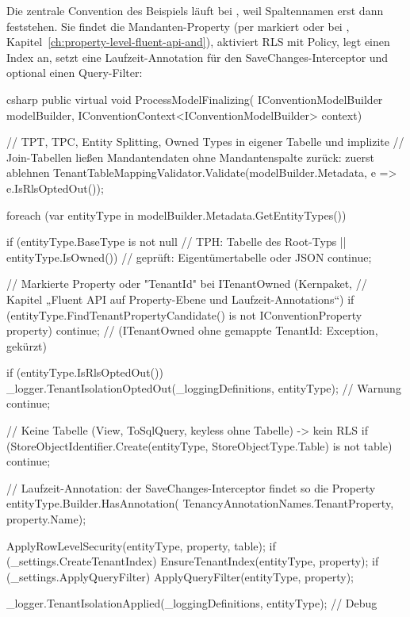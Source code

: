 Die zentrale Convention des Beispiels läuft bei , weil
Spaltennamen erst dann feststehen. Sie findet die Mandanten-Property (per
 markiert oder
 bei ,
Kapitel~\ref{ch:property-level-fluent-api-and}), aktiviert RLS mit Policy, legt einen Index
an, setzt eine Laufzeit-Annotation für den SaveChanges-Interceptor und optional einen
Query-Filter:

\begin{sourcecode}{csharp}
public virtual void ProcessModelFinalizing(
    IConventionModelBuilder modelBuilder,
    IConventionContext<IConventionModelBuilder> context)
{
    // TPT, TPC, Entity Splitting, Owned Types in eigener Tabelle und implizite
    // Join-Tabellen ließen Mandantendaten ohne Mandantenspalte zurück: zuerst ablehnen
    TenantTableMappingValidator.Validate(modelBuilder.Metadata, e => e.IsRlsOptedOut());

    foreach (var entityType in modelBuilder.Metadata.GetEntityTypes())
    {
        if (entityType.BaseType is not null       // TPH: Tabelle des Root-Typs
            || entityType.IsOwned())              // geprüft: Eigentümertabelle oder JSON
            continue;

        // Markierte Property oder "TenantId" bei ITenantOwned (Kernpaket,
        // Kapitel „Fluent API auf Property-Ebene und Laufzeit-Annotations“)
        if (entityType.FindTenantPropertyCandidate() is not IConventionProperty property)
            continue;      // (ITenantOwned ohne gemappte TenantId: Exception, gekürzt)

        if (entityType.IsRlsOptedOut())
        {
            _logger.TenantIsolationOptedOut(_loggingDefinitions, entityType);  // Warnung
            continue;
        }

        // Keine Tabelle (View, ToSqlQuery, keyless ohne Tabelle) -> kein RLS
        if (StoreObjectIdentifier.Create(entityType, StoreObjectType.Table)
            is not { } table)
            continue;

        // Laufzeit-Annotation: der SaveChanges-Interceptor findet so die Property
        entityType.Builder.HasAnnotation(
            TenancyAnnotationNames.TenantProperty, property.Name);

        ApplyRowLevelSecurity(entityType, property, table);
        if (_settings.CreateTenantIndex) EnsureTenantIndex(entityType, property);
        if (_settings.ApplyQueryFilter) ApplyQueryFilter(entityType, property);

        _logger.TenantIsolationApplied(_loggingDefinitions, entityType);       // Debug
    }
}
\end{sourcecode}

